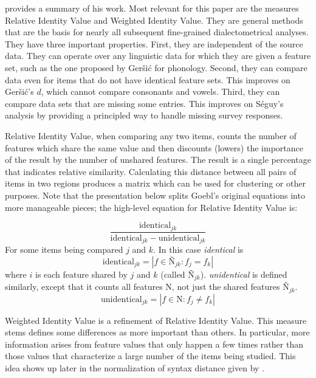 \documentclass[11pt]{article}
\begin{document}
 provides a summary of his work. Most relevant for
this paper are the measures Relative Identity Value and Weighted
Identity Value. They are general methods that are the basis for nearly
all subsequent fine-grained dialectometrical analyses. They have three
important properties. First, they are independent of the source
data. They can operate over any linguistic data for which they are
given a feature set, such as the one proposed by Ger\v{s}i\'c for
phonology. Second, they can compare data even for items that do not
have identical feature sets. This improves on Ger\v{s}i\'c's $d$,
which cannot compare consonants and vowels. Third, they can compare
data sets that are missing some entries. This improves on S\'eguy's
analysis by providing a principled way to handle missing survey
responses.

Relative Identity Value, when comparing any two items, counts the
number of features which share the same value and then discounts
(lowers) the importance of the result by the number of unshared
features. The result is a single percentage that indicates
relative similarity. Calculating this distance between all pairs
of items in two regions produces a matrix which can be used for
clustering or other purposes. Note that the presentation below splits
Goebl's original equations into more manageable pieces; the high-level
equation for Relative Identity Value is:

\begin{equation}
  \frac{\textrm{identical}_{jk}} {\textrm{identical}_{jk} - \textrm{unidentical}_{jk}}
\label{riv}
\end{equation}
For some items being compared $j$ and $k$. In this case
\textit{identical} is
\begin{equation}
  \textrm{identical}_{jk} = |f \in \textrm{\~N}_{jk} : f_j = f_k|
\end{equation}
where $i$ is each feature shared by $j$ and $k$ (called
$\textrm{\~N}_{jk}$). \textit{unidentical} is defined similarly, except
that it counts all features N, not just the shared features
$\textrm{\~N}_{jk}$.
\begin{equation}
  \textrm{unidentical}_{jk} = |f \in \textrm{N} : f_j \neq f_k|
\end{equation}

Weighted Identity Value is a refinement of Relative Identity
Value. This measure stems defines some differences as more
important than others. In particular, more information arises from
feature values that only happen a few times rather than those values
that characterize a large number of the items being studied.  This
idea shows up later in the normalization of syntax distance given by
.
\end{document}
